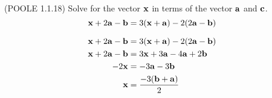 \begin{problem}{\problemnum \, \textsf{(POOLE 1.1.18)}}
Solve for the vector $\mathbf{x}$ in terms of the vector $\mathbf{a}$ and $\mathbf{c}$.\\
\[\mathbf{x} + 2\mathbf{a} - \mathbf{b} = 3(\mathbf{x} + \mathbf{a}) - 2(2\mathbf{a} - \mathbf{b})\]
\end{problem}
\begin{solution}
	\begin{align*}
		\mathbf{x} + 2\mathbf{a} - \mathbf{b} &= 3(\mathbf{x} + \mathbf{a}) - 2(2\mathbf{a} - \mathbf{b}) \\
		\mathbf{x} + 2\mathbf{a} - \mathbf{b} &= 3\mathbf{x} + 3\mathbf{a} - 4\mathbf{a} + 2\mathbf{b} \\
		           -2\mathbf{x} &= -3\mathbf{a} - 3\mathbf{b} \\
		             \mathbf{x} &= {-3(\mathbf{b} + \mathbf{a}) \over 2}
	\end{align*}
\end{solution}
